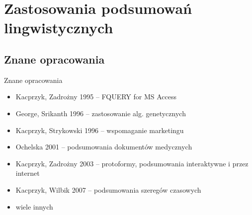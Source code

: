 \documentclass{beamer}
\begin{document}
\section{Zastosowania podsumowań lingwistycznych}
\subsection{Znane opracowania}
\begin{frame}{Znane opracowania}%
\begin{itemize}
\item <1->Kacprzyk, Zadrożny 1995		-- \alert<1>{FQUERY for MS Access}
\item George, Srikanth 1996		-- \alert<2>{zastosowanie alg. genetycznych}
\item <3->Kacprzyk, Strykowski 1996	-- \alert<3>{wspomaganie marketingu}
\item <3->Ochelska 2001			-- \alert<4>{podsumowania dokumentów
medycznych}
\item <5->Kacprzyk, Zadrożny 2003		-- \alert<5>{protoformy, podsumowania interaktywne i przez internet}
\item <5->Kacprzyk, Wilbik 2007		-- \alert<6>{podsumowania szeregów
czasowych}
\item <5->wiele innych
\end{itemize}
\end{frame}
\end{document}
